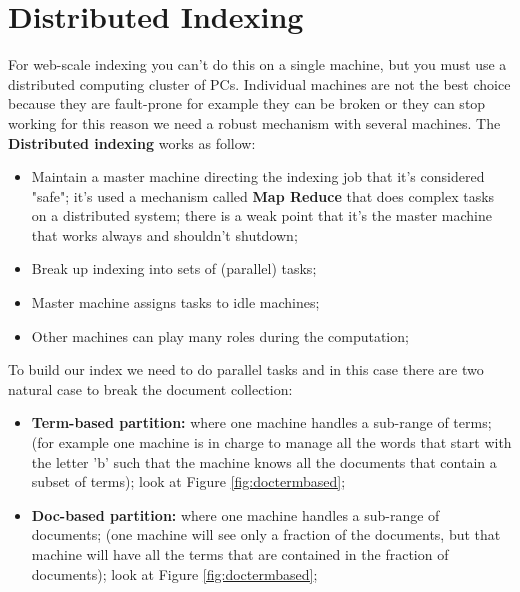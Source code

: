 \section{Distributed Indexing}
For web-scale indexing you can't do this on a single machine, but you must use a distributed computing cluster of PCs. Individual machines are not the best choice because they are fault-prone for example they can be broken or they can stop working for this reason we need a robust mechanism with several machines.\newline
The \textbf{Distributed indexing} works as follow:
\begin{itemize}
    \item Maintain a master machine directing the indexing job that it's considered "safe"; it's used a mechanism called \textbf{Map Reduce} that does complex tasks on a distributed system; there is a weak point that it's the master machine that works always and shouldn't shutdown;
    \item Break up indexing into sets of (parallel) tasks;
    \item Master machine assigns tasks to idle machines;
    \item Other machines can play many roles during the computation;
\end{itemize}
To build our index we need to do parallel tasks and in this case there are two natural case to break the document collection:
\begin{itemize}
    \item \textbf{Term-based partition:} where one machine handles a sub-range of terms; (for example one machine is in charge to manage all the words that start with the letter 'b' such that the machine knows all the documents that contain a subset of terms); look at Figure \ref{fig:doctermbased};
    \item \textbf{Doc-based partition:} where one machine handles a sub-range of documents; (one machine will see only a fraction of the documents, but that machine will have all the terms that are contained in the fraction of documents); look at Figure \ref{fig:doctermbased};
\end{itemize}
